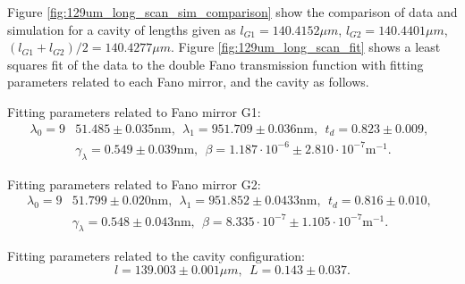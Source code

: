 Figure \ref{fig:129um_long_scan_sim_comparison} show the comparison of data and simulation for a cavity of lengths given as $l_{G1} = 140.4152 \mu m$, $l_{G2} = 140.4401 \mu m$, $(l_{G1} + l_{G2})/2 = 140.4277 \mu m$. Figure \ref{fig:129um_long_scan_fit} shows a least squares fit of the data to the double Fano transmission function with fitting parameters related to each Fano mirror, and the cavity as follows.

Fitting parameters related to Fano mirror G1:
\begin{equation}
    \begin{split}
        \lambda_0 = 9&51.485 \pm 0.035 \text{nm}, \:\: \lambda_1 = 951.709 \pm 0.036 \text{nm}, \:\: t_d = 0.823 \pm 0.009, \:\: \\&\gamma_{\lambda} = 0.549 \pm 0.039 \text{nm}, \:\: \beta = 1.187 \cdot 10^{-6} \pm 2.810 \cdot 10^{-7} \text{m}^{-1}.
    \end{split}
\end{equation}

Fitting parameters related to Fano mirror G2:
\begin{equation}
    \begin{split}
        \lambda_0 = 9&51.799 \pm 0.020 \text{nm}, \:\: \lambda_1 = 951.852 \pm 0.0433 \text{nm}, \:\: t_d = 0.816 \pm 0.010, \:\: \\&\gamma_{\lambda} = 0.548 \pm 0.043 \text{nm}, \:\: \beta = 8.335 \cdot 10^{-7} \pm 1.105 \cdot 10^{-7} \text{m}^{-1}.
    \end{split}
\end{equation}

Fitting parameters related to the cavity configuration:
\begin{equation}
    l = 139.003 \pm 0.001 \mu m, \:\: L = 0.143 \pm 0.037.
\end{equation}

